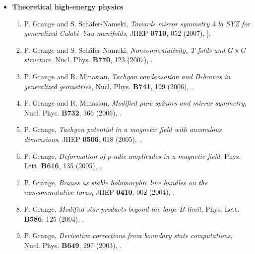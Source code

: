 \documentclass[letterpaper,11pt]{article}
\begin{document}
\begin{itemize}
\item{\sc \bf Theoretical high-energy physics}
\begin{enumerate}
\item \vspace{-.03in} P. Grange and S. Sch\"afer-Nameki, {\em Towards mirror symmetry \`a la SYZ for generalized  Calabi--Yau
manifolds}, JHEP {\bf 0710}, 052 (2007), {\ttfamily [arXiv:0708.2392 [hep-th]]}.  
\item \vspace{-.03in} P. Grange and S. Sch\"afer-Nameki, {\em Noncommutativity, T-folds and $G\times G$ structure},
 Nucl. Phys. {\bf B770}, 123 (2007), {}.
\item \vspace{-.03in} P. Grange and R. Minasian, {\em Tachyon condensation and D-branes in generalized geometries},
 Nucl. Phys. {\bf B741}, 199 (2006), {}.
\item \vspace{-.02in} P. Grange and R. Minasian, {\em Modified pure spinors and mirror symmetry},
 Nucl. Phys. {\bf B732}, 366 (2006), {}.
\item \vspace{-.03in} P. Grange, {\em Tachyon potential in a magnetic field with anomalous dimensions},
JHEP {\bf 0506}, 018 (2005), {}.
\item \vspace{-.03in} P. Grange, {\em Deformation of $p$-adic amplitudes in a magnetic field},
Phys. Lett. {\bf B616}, 135 (2005), {}.
\item \vspace{-.03in} P. Grange, {\em Branes as stable holomorphic line bundles on the noncommutative torus},
JHEP {\bf 0410}, 002 (2004), {}.
\item \vspace{-.03in} P. Grange, {\em Modified star-products beyond the large-$B$ limit}, 
Phys. Lett. {\bf B586}, 125 (2004), {}.
\item \vspace{-.03in} P. Grange, {\em Derivative corrections from boundary state computations}, Nucl. Phys.
{\bf B649}, 297 (2003), {}. 
\end{enumerate}
\end{itemize}
\end{document}
